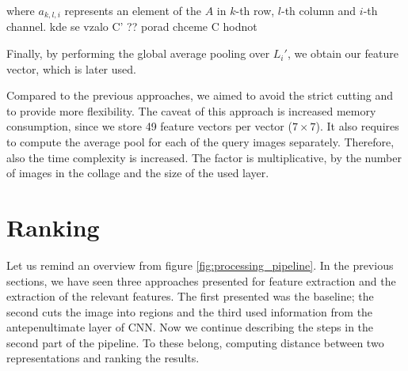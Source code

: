 where $a_{k,l,i}$ represents an element of the $A$ in $k$-th row, $l$-th column and $i$-th channel. {\color{red} kde se vzalo C' ?? porad chceme C hodnot}

Finally, by performing the global average pooling over $L_i'$, we obtain our feature vector, which is later used.

Compared to the previous approaches, we aimed to avoid the strict cutting and to provide more flexibility. The caveat of this approach is increased memory consumption, since we store 49 feature vectors per vector ($7\times7$). It also requires to compute the average pool for each of the query images separately. Therefore, also the time complexity is increased. The factor is multiplicative, by the number of images in the collage and the size of the used layer.



\section{Ranking}

Let us remind an overview from figure \ref{fig:processing_pipeline}. In the previous sections, we have seen three approaches presented for feature extraction and the extraction of the relevant features. The first presented was the baseline; the second cuts the image into regions and the third used information from the antepenultimate layer of CNN. Now we continue describing the steps in the second part of the pipeline. To these belong, computing distance between two representations and ranking the results.

